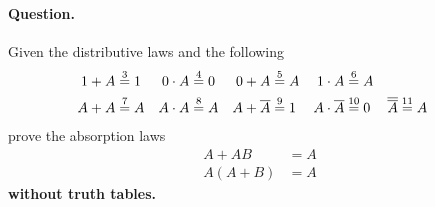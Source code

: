 \paragraph{Question.} Given the distributive laws and the following
\begin{align*}
1 + A &\stackrel{3}{=} 1 & 0 \cdot A &\stackrel{4}{=} 0 & 0 + A &\stackrel{5}{=} A & 1
\cdot A &\stackrel{6}{=} A\\
A + A &\stackrel{7}{=} A & A \cdot A &\stackrel{8}{=} A & A + \overline{A} &\stackrel{9}{=}
1 & A \cdot \overline{A} &\stackrel{10}{=} 0 & \overline{\overline{A}}
&\stackrel{11}{=} A
\end{align*}
\noindent prove the absorption laws
\begin{align}
A + AB &= A\\
A (A+B) &= A
\end{align}
\textbf{without truth tables.}
